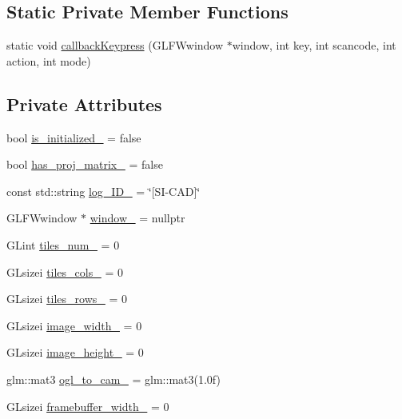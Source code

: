 \subsection*{Static Private Member Functions}
\begin{DoxyCompactItemize}
\item 
static void \mbox{\hyperlink{classSICAD_ae2d8d44b5bbcf7329e180aafda2df386}{callback\+Keypress}} (G\+L\+F\+Wwindow $\ast$window, int key, int scancode, int action, int mode)
\end{DoxyCompactItemize}
\subsection*{Private Attributes}
\begin{DoxyCompactItemize}
\item 
bool \mbox{\hyperlink{classSICAD_aa624c978497506de4a255c5f0301579f}{is\+\_\+initialized\+\_\+}} = false
\item 
bool \mbox{\hyperlink{classSICAD_a0eb57d114f3f6b50be13bd882552b2f7}{has\+\_\+proj\+\_\+matrix\+\_\+}} = false
\item 
const std\+::string \mbox{\hyperlink{classSICAD_a9eb34b659cac13b8442ca821455cc1f1}{log\+\_\+\+I\+D\+\_\+}} = \char`\"{}\mbox{[}SI-\/C\+AD\mbox{]}\char`\"{}
\item 
G\+L\+F\+Wwindow $\ast$ \mbox{\hyperlink{classSICAD_a3e55fa9ffa99ef200bfc15d6a105698a}{window\+\_\+}} = nullptr
\item 
G\+Lint \mbox{\hyperlink{classSICAD_a68723ee57cc9a1e02bc0dbda54a584ff}{tiles\+\_\+num\+\_\+}} = 0
\item 
G\+Lsizei \mbox{\hyperlink{classSICAD_ac2678cc1ad1b008912fec7e6892b23e1}{tiles\+\_\+cols\+\_\+}} = 0
\item 
G\+Lsizei \mbox{\hyperlink{classSICAD_aca3efa8f3fb75b3ee02474d4ec00e49e}{tiles\+\_\+rows\+\_\+}} = 0
\item 
G\+Lsizei \mbox{\hyperlink{classSICAD_ade37d5c3960d164acaa749745f55070f}{image\+\_\+width\+\_\+}} = 0
\item 
G\+Lsizei \mbox{\hyperlink{classSICAD_a093da94bc84a46d08f71051c4d88c176}{image\+\_\+height\+\_\+}} = 0
\item 
glm\+::mat3 \mbox{\hyperlink{classSICAD_a95af2758122e6420369516fd13fd03cc}{ogl\+\_\+to\+\_\+cam\+\_\+}} = glm\+::mat3(1.\+0f)
\item 
G\+Lsizei \mbox{\hyperlink{classSICAD_a08c86b826a1784b132bac3f0792fc604}{framebuffer\+\_\+width\+\_\+}} = 0
\item 

\end{DoxyCompactItemize}
